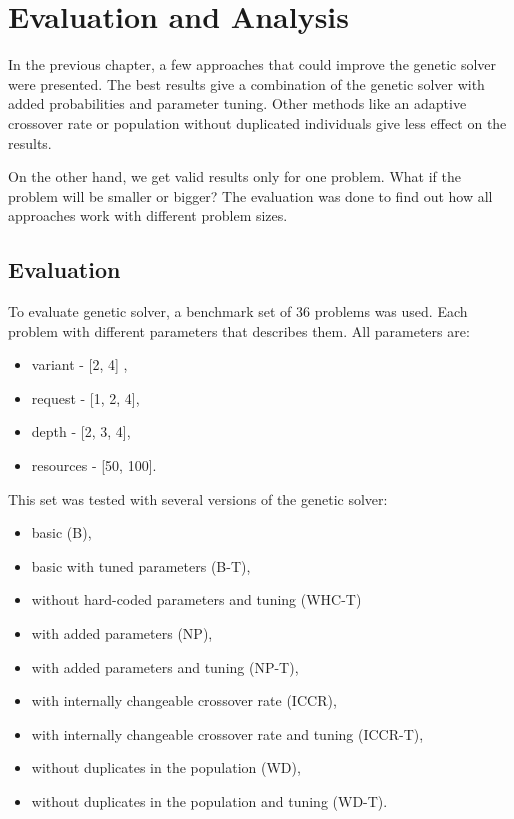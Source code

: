 \chapter{Evaluation and Analysis}

In the previous chapter, a few approaches that could improve the genetic solver were presented.
The best results give a combination of the genetic solver with added probabilities and parameter tuning.
Other methods like an adaptive crossover rate or population without duplicated individuals give less effect on the results.

On the other hand, we get valid results only for one problem. What if the problem will be smaller or bigger?
The evaluation was done to find out how all approaches work with different problem sizes. 

\section{Evaluation}

To evaluate genetic solver, a benchmark set of 36 problems was used.
Each problem with different parameters that describes them.
All parameters are:

\begin{itemize}
	\item variant - [2, 4] ,
	\item request - [1, 2, 4],
	\item depth - [2, 3, 4],
	\item resources - [50, 100].
\end{itemize}

This set was tested with several versions of the genetic solver:

\begin{itemize}
	\item basic (B),
	\item basic with tuned parameters (B-T),
	\item without hard-coded parameters and tuning (WHC-T) 
	\item with added parameters (NP),
	\item with added parameters and tuning (NP-T),
	\item with internally changeable crossover rate (ICCR),
	\item with internally changeable crossover rate and tuning (ICCR-T),
	\item without duplicates in the population (WD),
	\item without duplicates in the population and tuning (WD-T).
\end{itemize}

